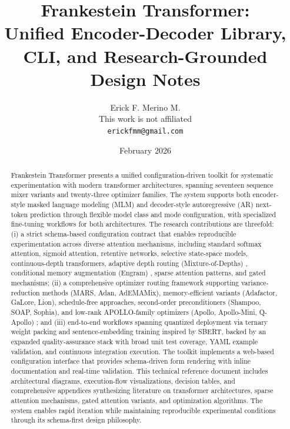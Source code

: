 \documentclass[11pt,a4paper]{article}
\title{Frankestein Transformer:\\Unified Encoder-Decoder Library, CLI, and Research-Grounded Design Notes}
\author{
Erick F. Merino M. \\
This work is not affiliated \\
\texttt{erickfmm@gmail.com}
}
\date{February 2026}
\begin{document}
\maketitle

\begin{abstract}
Frankestein Transformer presents a unified configuration-driven toolkit for systematic experimentation with modern transformer architectures, spanning seventeen sequence mixer variants and twenty-three optimizer families. The system supports both encoder-style masked language modeling (MLM) and decoder-style autoregressive (AR) next-token prediction through flexible model class and mode configuration, with specialized fine-tuning workflows for both architectures. The research contributions are threefold: (i) a strict schema-based configuration contract that enables reproducible experimentation across diverse attention mechanisms, including standard softmax attention, sigmoid attention, retentive networks, selective state-space models, continuous-depth transformers, adaptive depth routing (Mixture-of-Depths) \citep{zhu2026mixtureofdepthsattention}, conditional memory augmentation (Engram) \citep{cheng2026conditionalmemoryscalablelookup}, sparse attention patterns, and gated mechanisms; (ii) a comprehensive optimizer routing framework supporting variance-reduction methods (MARS, Adan, AdEMAMix), memory-efficient variants (Adafactor, GaLore, Lion), schedule-free approaches, second-order preconditioners (Shampoo, SOAP, Sophia), and low-rank APOLLO-family optimizers (Apollo, Apollo-Mini, Q-Apollo) \citep{zhu2025apollosgdlikememoryadamwlevel}; and (iii) end-to-end workflows spanning quantized deployment via ternary weight packing and sentence-embedding training inspired by SBERT, backed by an expanded quality-assurance stack with broad unit test coverage, YAML example validation, and continuous integration execution. The toolkit implements a web-based configuration interface that provides schema-driven form rendering with inline documentation and real-time validation. This technical reference document includes architectural diagrams, execution-flow visualizations, decision tables, and comprehensive appendices synthesizing literature on transformer architectures, sparse attention mechanisms, gated attention variants, and optimization algorithms. The system enables rapid iteration while maintaining reproducible experimental conditions through its schema-first design philosophy.
\end{abstract}

\tableofcontents
\newpage
\end{document}
